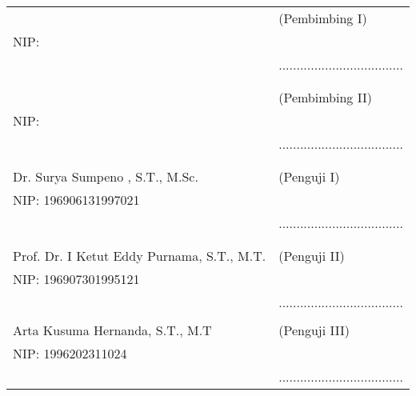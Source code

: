 \noindent
\begin{tabularx}{\textwidth}{X l}
  \advisor{}               & (Pembimbing I)                      \\
  NIP: \advisornip{}       &                                     \\
                           & ................................... \\
                           &                                     \\
                           &                                     \\
  \coadvisor{}             & (Pembimbing II)                     \\
  NIP: \coadvisornip{}     &                                     \\
                           & ................................... \\
                           &                                     \\
                           &                                     \\
  Dr. Surya Sumpeno , S.T., M.Sc.                         & (Penguji I)                         \\
  NIP:  196906131997021    &                                     \\
                           & ................................... \\
                           &                                     \\
                           &                                     \\
  Prof. Dr. I Ketut Eddy Purnama, S.T., M.T.              & (Penguji II)                        \\
  NIP:  196907301995121    &                                     \\
                           & ................................... \\
                           &                                     \\
  Arta Kusuma Hernanda, S.T., M.T                         & (Penguji III)                       \\
  NIP:  1996202311024      &                                     \\
                           & ................................... \\  
\end{tabularx}
\endgroup

